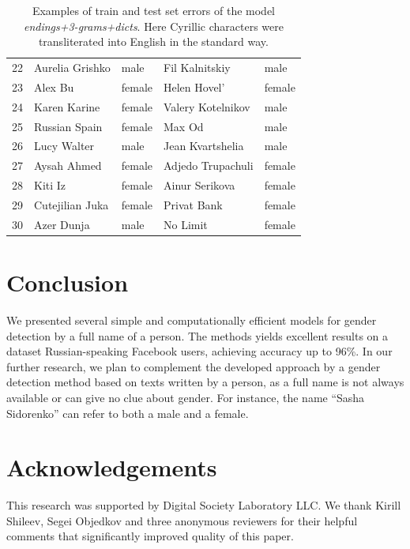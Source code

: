 \documentclass[runningheads,a4paper]{llncs}
\begin{document}
\begin{table}[h]
\begin{center}
\begin{tabular}{|l|ll|ll|}
22 & Aurelia Grishko & male & Fil Kalnitskiy & male \\  
23 & Alex Bu  & female & Helen Hovel' & female \\  
24 & Karen Karine & female & Valery Kotelnikov & male \\  
25 & Russian Spain & female & Max Od & male \\  
26 & Lucy Walter & male & Jean Kvartshelia & male \\  
27 & Aysah Ahmed & female & Adjedo Trupachuli & female \\  
28 & Kiti Iz  & female & Ainur Serikova & female \\  
29 & Cutejilian Juka  & female & Privat Bank & female \\  
30 & Azer Dunja  & male & No Limit & female \\  

\hline
\end{tabular}
\end{center}
\caption{ Examples of train and test set errors of the model \textit{endings+3-grams+dicts}. Here Cyrillic characters were transliterated into English in the standard way. }
\label{tab:errors}
\end{table}


 

\section{Conclusion}

We presented several simple and computationally efficient models for gender detection by a full name of a person. The methods yields excellent results on a dataset Russian-speaking Facebook users, achieving accuracy up to 96\%. In our further research, we plan to complement the developed approach by a gender detection method based on texts written by a person, as a full name is not always available or can give no clue about gender. For instance, the name ``Sasha Sidorenko'' can refer to both a male and a female. 

\section*{Acknowledgements}

This research was supported by Digital Society Laboratory LLC. We thank Kirill Shileev, Segei Objedkov and three anonymous reviewers for their helpful comments that significantly improved quality of this paper.



\end{document}
